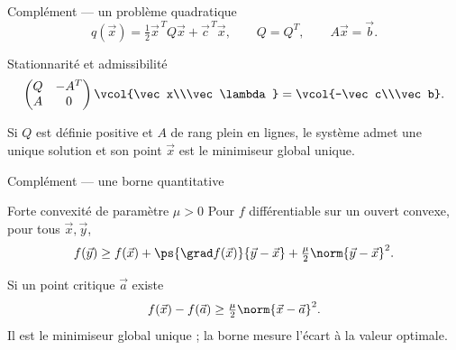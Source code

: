 \begin{frame}[t]{Complément — un problème quadratique}
\coursanalyse
{}
\[q(\vec x)=\tfrac12\vec x^{\,T}Q\vec x+\vec c^{\,T}\vec x,\qquad Q=Q^T,\qquad A\vec x=\vec b.\]
\begin{resultat}{Stationnarité et admissibilité}
\[\begin{pmatrix}Q&-A^T\\A&0\end{pmatrix}\vcol{\vec x\\\vec\lambda}=\vcol{-\vec c\\\vec b}.\]
\end{resultat}
\vfill Si $Q$ est définie positive et $A$ de rang plein en lignes, le système admet une unique solution et son point $\vec x$ est le minimiseur global unique.
\end{frame}

\begin{frame}[t]{Complément — une borne quantitative}
\coursanalyse
{}
\begin{notion}{Forte convexité de paramètre $\mu>0$}
Pour $f$ différentiable sur un ouvert convexe, pour tous $\vec x,\vec y$,
\[f(\vec y)\ge f(\vec x)+\ps{\grad f(\vec x)}{\vec y-\vec x}+\tfrac\mu2\norm{\vec y-\vec x}^2.\]
\end{notion}
\begin{resultat}{Si un point critique $\vec a$ existe}
\[f(\vec x)-f(\vec a)\ge\tfrac\mu2\norm{\vec x-\vec a}^2.\]
Il est le minimiseur global unique ; la borne mesure l’écart à la valeur optimale.
\end{resultat}
\end{frame}
